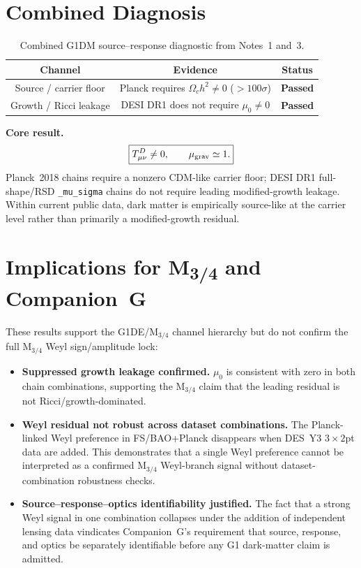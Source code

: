 \documentclass[11pt]{article}
\begin{document}
\section{Combined Diagnosis}

\begin{table}[h]
\centering
\caption{Combined G1DM source--response diagnostic from
Notes~1 and~3.}\label{tab:combined}
\begin{tabular}{ccc}
\toprule
Channel & Evidence & Status \\
\midrule
Source / carrier floor & Planck requires $\Omega_c h^2\neq0$ ($>\!100\sigma$) & \textbf{Passed} \\
Growth / Ricci leakage & DESI DR1 does not require $\mu_0\neq0$ & \textbf{Passed} \\
\bottomrule
\end{tabular}
\end{table}

\vspace{0.3em}
\noindent\textbf{Core result.}\;
\begin{equation}
\boxed{T_{\mu\nu}^{D}\neq0,\qquad \mu_{\rm grav}\simeq1.}
\end{equation}
Planck~2018 chains require a nonzero CDM-like carrier floor; DESI DR1
full-shape/RSD \texttt{\_mu\_sigma} chains do not require leading modified-growth
leakage.  Within current public data, dark matter is empirically source-like at the
carrier level rather than primarily a modified-growth residual.

\section{Implications for M\textsubscript{3/4} and Companion~G}

These results support the G1DE/M$_{3/4}$ channel hierarchy but do not confirm the full
M$_{3/4}$ Weyl sign/amplitude lock:

\begin{itemize}
\item \textbf{Suppressed growth leakage confirmed.}\;
  $\mu_0$ is consistent with zero in both chain combinations, supporting
  the M$_{3/4}$ claim that the leading residual is not Ricci/growth-dominated.

\item \textbf{Weyl residual not robust across dataset combinations.}\;
  The Planck-linked Weyl preference in FS/BAO+Planck disappears when DES~Y3
  $3\times2$pt data are added.  This demonstrates that a single Weyl preference
  cannot be interpreted as a confirmed M$_{3/4}$ Weyl-branch signal without
  dataset-combination robustness checks.

\item \textbf{Source--response--optics identifiability justified.}\;
  The fact that a strong Weyl signal in one combination collapses under the addition
  of independent lensing data vindicates Companion~G's requirement that
  source, response, and optics be separately identifiable before any G1
  dark-matter claim is admitted.
\end{itemize}
\end{document}

